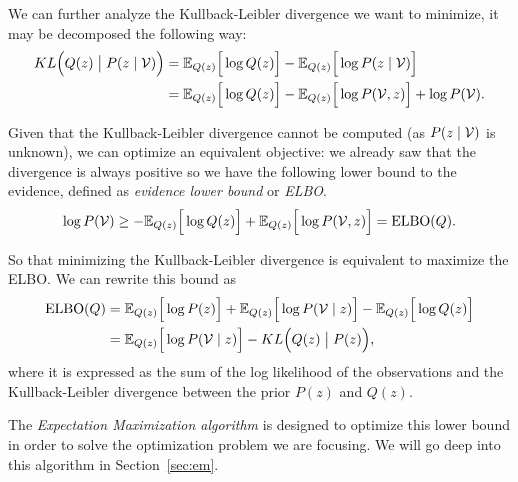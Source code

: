 We can further analyze the Kullback-Leibler divergence we want to minimize, it may be decomposed the following way:
\[
  \begin{aligned}
    KL\Big(Q(z) \bigm| P(z \mid \mathcal{V})\Big) &= \mathbb{E}_{Q(z)}\Big[\log{Q(z)}\Big] - \mathbb{E}_{Q(z)}\Big[\log{P(z \mid \mathcal{V})}\Big]\\
    &= \mathbb{E}_{Q(z)}\Big[\log{Q(z)}\Big] - \mathbb{E}_{Q(z)}\Big[\log{P(\mathcal{V}, z)}\Big] + \log{P(\mathcal{V})}.
  \end{aligned}
\]

Given that the Kullback-Leibler divergence cannot be computed (as \(P(z \mid \mathcal{V})\) is unknown), we can optimize an equivalent objective: we already saw that the divergence is always positive so we have the following lower bound to the evidence, defined as \emph{evidence lower bound} or \emph{ELBO}.
\[
  \log{P(\mathcal{V})} \geq  - \mathbb{E}_{Q(z)}\Big[\log{Q(z)}\Big] + \mathbb{E}_{Q(z)}\Big[\log{P(\mathcal{V}, z)}\Big]  = \text{ELBO}(Q).
\]

So that minimizing the Kullback-Leibler divergence is equivalent to maximize the ELBO. We can rewrite this bound as
\[
  \begin{aligned}
    \text{ELBO}(Q) &= \mathbb{E}_{Q(z)}\Big[\log{P(z)}\Big] + \mathbb{E}_{Q(z)}\Big[\log{P(\mathcal{V}\mid z)}\Big] - \mathbb{E}_{Q(z)}\Big[\log{Q(z)}\Big]\\
    &= \mathbb{E}_{Q(z)}\Big[\log{P(\mathcal{V}\mid z)}\Big] - KL\Big(Q(z) \bigm| P(z)\Big),
  \end{aligned}
\]
where it is expressed as the sum of the log likelihood of the observations and the Kullback-Leibler divergence between the prior \(P(z)\) and \(Q(z)\).

The \emph{Expectation Maximization algorithm} is designed to optimize this lower bound in order to solve the optimization problem we are focusing. We will go deep into this algorithm in Section~\ref{sec:em}.

